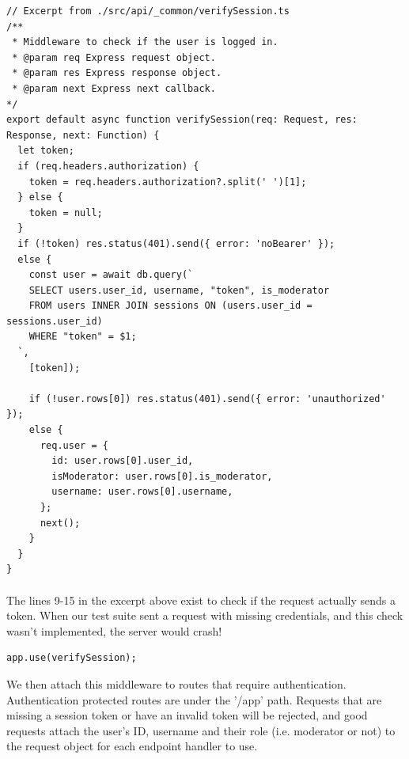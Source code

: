 \documentclass{report}
\begin{document}
\begin{verbatim}
// Excerpt from ./src/api/_common/verifySession.ts
/**
 * Middleware to check if the user is logged in.
 * @param req Express request object.
 * @param res Express response object.
 * @param next Express next callback.
*/
export default async function verifySession(req: Request, res: Response, next: Function) {
  let token;
  if (req.headers.authorization) {
    token = req.headers.authorization?.split(' ')[1];
  } else {
    token = null;
  }
  if (!token) res.status(401).send({ error: 'noBearer' });
  else {
    const user = await db.query(`
    SELECT users.user_id, username, "token", is_moderator
    FROM users INNER JOIN sessions ON (users.user_id = sessions.user_id)
    WHERE "token" = $1;
  `,
    [token]);

    if (!user.rows[0]) res.status(401).send({ error: 'unauthorized' });
    else {
      req.user = {
        id: user.rows[0].user_id,
        isModerator: user.rows[0].is_moderator,
        username: user.rows[0].username,
      };
      next();
    }
  }
}
\end{verbatim}
\paragraph{}
The lines 9-15 in the excerpt above exist to check if the request actually sends a token. When our test suite sent a request with missing credentials, and this check wasn't implemented, the server would crash!

\begin{verbatim}
app.use(verifySession);
\end{verbatim}
We then attach this middleware to routes that require authentication. Authentication protected routes are under the  '/app' path. Requests that are missing a session token or have an invalid token will be rejected, and good requests attach the user's ID, username and their role (i.e. moderator or not) to the request object for each endpoint handler to use.
\end{document}
